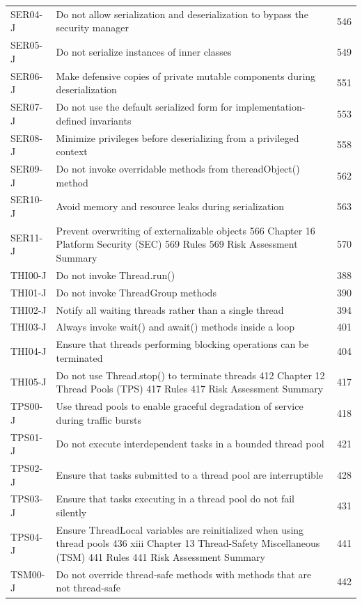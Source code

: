 \documentclass[11pt]{report}
\begin{document}
\begin{longtable}{@{}llr@{}}
SER04-J & Do not allow serialization and deserialization to bypass the security manager & 546\\
SER05-J & Do not serialize instances of inner classes & 549\\
SER06-J & Make defensive copies of private mutable components during deserialization & 551\\
SER07-J & Do not use the default serialized form for implementation-defined invariants & 553\\
SER08-J & Minimize privileges before deserializing from a privileged context & 558\\
SER09-J & Do not invoke overridable methods from thereadObject() method & 562\\
SER10-J & Avoid memory and resource leaks during serialization & 563\\
SER11-J & Prevent overwriting of externalizable objects 566 Chapter 16 Platform Security (SEC) 569 Rules 569 Risk Assessment Summary & 570\\
THI00-J & Do not invoke Thread.run() & 388\\
THI01-J & Do not invoke ThreadGroup methods & 390\\
THI02-J & Notify all waiting threads rather than a single thread & 394\\
THI03-J & Always invoke wait() and await() methods inside a loop & 401\\
THI04-J & Ensure that threads performing blocking operations can be terminated & 404\\
THI05-J & Do not use Thread.stop() to terminate threads 412 Chapter 12 Thread Pools (TPS) 417 Rules 417 Risk Assessment Summary & 417\\
TPS00-J & Use thread pools to enable graceful degradation of service during traffic bursts & 418\\
TPS01-J & Do not execute interdependent tasks in a bounded thread pool & 421\\
TPS02-J & Ensure that tasks submitted to a thread pool are interruptible & 428\\
TPS03-J & Ensure that tasks executing in a thread pool do not fail silently & 431\\
TPS04-J & Ensure ThreadLocal variables are reinitialized when using thread pools 436 xiii Chapter 13 Thread-Safety Miscellaneous (TSM) 441 Rules 441 Risk Assessment Summary & 441\\
TSM00-J & Do not override thread-safe methods with methods that are not thread-safe & 442\\

\end{longtable}
\end{document}
